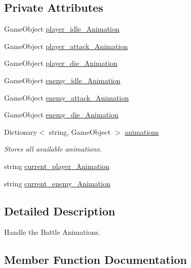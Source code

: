 \subsection*{Private Attributes}
\begin{DoxyCompactItemize}
\item 
Game\+Object \mbox{\hyperlink{class_animation_manager_a7d4c4e709012d79b5d0280df8dc969dd}{player\+\_\+idle\+\_\+\+Animation}}
\item 
Game\+Object \mbox{\hyperlink{class_animation_manager_ac47bd136a0167570bc32c600793ea386}{player\+\_\+attack\+\_\+\+Animation}}
\item 
Game\+Object \mbox{\hyperlink{class_animation_manager_a79d536bf45e1575de70ef9fef6806f66}{player\+\_\+die\+\_\+\+Animation}}
\item 
Game\+Object \mbox{\hyperlink{class_animation_manager_ac301b4ba5dc18d2899769b53a660f17c}{enemy\+\_\+idle\+\_\+\+Animation}}
\item 
Game\+Object \mbox{\hyperlink{class_animation_manager_afde052f938d2e0d411c79c5d04c68077}{enemy\+\_\+attack\+\_\+\+Animation}}
\item 
Game\+Object \mbox{\hyperlink{class_animation_manager_ab5c3493c712e06dafe93676c80805f17}{enemy\+\_\+die\+\_\+\+Animation}}
\item 
Dictionary$<$ string, Game\+Object $>$ \mbox{\hyperlink{class_animation_manager_a9300d9a81ec105f22aad052a4f04eca1}{animations}}
\begin{DoxyCompactList}\small\item\em Stores all available animations. \end{DoxyCompactList}\item 
string \mbox{\hyperlink{class_animation_manager_aef0c8a682a163cbb1222604d4e7887c3}{current\+\_\+player\+\_\+\+Animation}}
\item 
string \mbox{\hyperlink{class_animation_manager_a358d48e7e9b63bb00f8b866e16a41a21}{current\+\_\+enemy\+\_\+\+Animation}}
\end{DoxyCompactItemize}


\subsection{Detailed Description}
Handle the Battle Animations. 

\subsection{Member Function Documentation}
\mbox{\label{class_animation_manager_a24e3383ca8d2acf1cf37211f8e9f2131}} 
